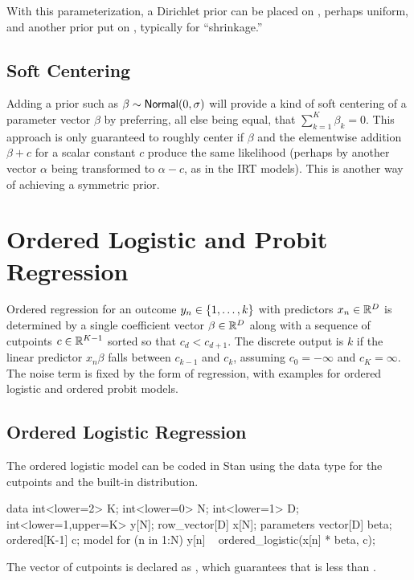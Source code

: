 With this parameterization, a Dirichlet prior can be placed on
, perhaps uniform, and another prior put on
, typically for ``shrinkage.''  


\subsection{Soft Centering}

Adding a prior such as $\beta \sim \distro{Normal}(0,\sigma)$ will provide a kind
of soft centering of a parameter vector $\beta$ by preferring, all
else being equal, that $\sum_{k=1}^K \beta_k = 0$.  This approach is only
guaranteed to roughly center  if $\beta$ and the elementwise addition $\beta + c$
for a scalar constant $c$ produce the same likelihood (perhaps by
another vector $\alpha$ being transformed to $\alpha - c$, as in the
IRT models).  This is another way of achieving a symmetric prior.


\section{Ordered Logistic and Probit Regression}\label{ordered-logistic.section}

Ordered regression for an outcome $y_n \in \setlist{1,\ldots, k}$ with
predictors $x_n \in \reals^D$ is determined by a single coefficient
vector $\beta \in \reals^D$ along with a sequence of cutpoints $c \in
\reals^{K-1}$ sorted so that $c_d < c_{d+1}$.  The discrete output is
$k$ if the linear predictor $x_n \beta$ falls between $c_{k-1}$ and
$c_k$, assuming $c_0 = -\infty$ and $c_K = \infty$.  The noise term is
fixed by the form of regression, with examples for ordered logistic
and ordered probit models.  

\subsection{Ordered Logistic Regression}

The ordered logistic model can be coded in Stan using the
 data type for the cutpoints and the built-in
 distribution.
%

\begin{stancode}
data {
  int<lower=2> K;
  int<lower=0> N;
  int<lower=1> D;
  int<lower=1,upper=K> y[N];
  row_vector[D] x[N];
} 
parameters {
  vector[D] beta;
  ordered[K-1] c;
} 
model {
  for (n in 1:N)
    y[n] ~ ordered_logistic(x[n] * beta, c);
}
\end{stancode}
% 
The vector of cutpoints  is declared as ,
which guarantees that  is less than . 

